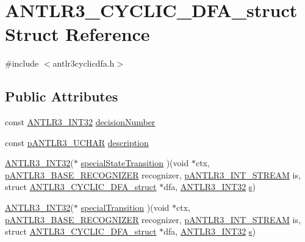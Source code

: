 \hypertarget{struct_a_n_t_l_r3___c_y_c_l_i_c___d_f_a__struct}{\section{A\-N\-T\-L\-R3\-\_\-\-C\-Y\-C\-L\-I\-C\-\_\-\-D\-F\-A\-\_\-struct Struct Reference}
\label{struct_a_n_t_l_r3___c_y_c_l_i_c___d_f_a__struct}
}


{\ttfamily \#include $<$antlr3cyclicdfa.\-h$>$}

\subsection*{Public Attributes}
\begin{DoxyCompactItemize}
\item 
const \hyperlink{antlr3defs_8h_a6faef5c4687f8eb633d2aefea93973ca}{A\-N\-T\-L\-R3\-\_\-\-I\-N\-T32} \hyperlink{struct_a_n_t_l_r3___c_y_c_l_i_c___d_f_a__struct_a05be0e9321d8b6b9702cda3b34fe9834}{decision\-Number}
\item 
const \hyperlink{antlr3defs_8h_a2240248b17f7ab59fcb6fb9364208add}{p\-A\-N\-T\-L\-R3\-\_\-\-U\-C\-H\-A\-R} \hyperlink{struct_a_n_t_l_r3___c_y_c_l_i_c___d_f_a__struct_a2ea19b86bf05014f68fa9ca3ecc760dc}{description}
\item 
\hyperlink{antlr3defs_8h_a6faef5c4687f8eb633d2aefea93973ca}{A\-N\-T\-L\-R3\-\_\-\-I\-N\-T32}($\ast$ \hyperlink{struct_a_n_t_l_r3___c_y_c_l_i_c___d_f_a__struct_a97d6b475952a30aab4ce67a33e4b8e5c}{special\-State\-Transition} )(void $\ast$ctx, \hyperlink{group___a_n_t_l_r3___b_a_s_e___r_e_c_o_g_n_i_z_e_r_ga5aeeb8dcbf65f45605ae07cbd618e24c}{p\-A\-N\-T\-L\-R3\-\_\-\-B\-A\-S\-E\-\_\-\-R\-E\-C\-O\-G\-N\-I\-Z\-E\-R} recognizer, \hyperlink{antlr3interfaces_8h_af34d949f6aa442e8e7770e420977d338}{p\-A\-N\-T\-L\-R3\-\_\-\-I\-N\-T\-\_\-\-S\-T\-R\-E\-A\-M} is, struct \hyperlink{struct_a_n_t_l_r3___c_y_c_l_i_c___d_f_a__struct}{A\-N\-T\-L\-R3\-\_\-\-C\-Y\-C\-L\-I\-C\-\_\-\-D\-F\-A\-\_\-struct} $\ast$dfa, \hyperlink{antlr3defs_8h_a6faef5c4687f8eb633d2aefea93973ca}{A\-N\-T\-L\-R3\-\_\-\-I\-N\-T32} \hyperlink{aberrations___t_e_m_8m_aef29541a06b7f933d32a804307db13af}{s})
\item 
\hyperlink{antlr3defs_8h_a6faef5c4687f8eb633d2aefea93973ca}{A\-N\-T\-L\-R3\-\_\-\-I\-N\-T32}($\ast$ \hyperlink{struct_a_n_t_l_r3___c_y_c_l_i_c___d_f_a__struct_a56f2173867a94268438aa3fdda84b7ca}{special\-Transition} )(void $\ast$ctx, \hyperlink{group___a_n_t_l_r3___b_a_s_e___r_e_c_o_g_n_i_z_e_r_ga5aeeb8dcbf65f45605ae07cbd618e24c}{p\-A\-N\-T\-L\-R3\-\_\-\-B\-A\-S\-E\-\_\-\-R\-E\-C\-O\-G\-N\-I\-Z\-E\-R} recognizer, \hyperlink{antlr3interfaces_8h_af34d949f6aa442e8e7770e420977d338}{p\-A\-N\-T\-L\-R3\-\_\-\-I\-N\-T\-\_\-\-S\-T\-R\-E\-A\-M} is, struct \hyperlink{struct_a_n_t_l_r3___c_y_c_l_i_c___d_f_a__struct}{A\-N\-T\-L\-R3\-\_\-\-C\-Y\-C\-L\-I\-C\-\_\-\-D\-F\-A\-\_\-struct} $\ast$dfa, \hyperlink{antlr3defs_8h_a6faef5c4687f8eb633d2aefea93973ca}{A\-N\-T\-L\-R3\-\_\-\-I\-N\-T32} \hyperlink{aberrations___t_e_m_8m_aef29541a06b7f933d32a804307db13af}{s})

\end{DoxyCompactItemize}
